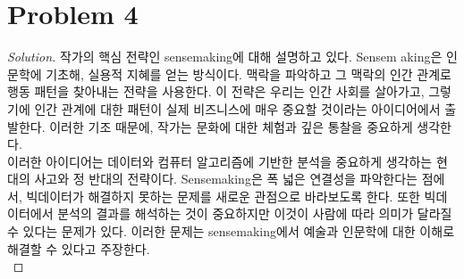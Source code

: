 \section*{Problem 4}
	\begin{proof} [Solution]
		작가의 핵심 전략인 sensemaking에 대해 설명하고 있다. Sensem aking은 인문학에 기초해, 실용적 지혜를 얻는 방식이다. 맥락을 파악하고 그 맥락의 인간 관계로 행동 패턴을 찾아내는 전략을 사용한다. 이 전략은 우리는 인간 사회를 살아가고, 그렇기에 인간 관계에 대한 패턴이 실제 비즈니스에 매우 중요할 것이라는 아이디어에서 출발한다. 이러한 기조 때문에, 작가는 문화에 대한 체험과 깊은 통찰을 중요하게 생각한다.\\
		이러한 아이디어는 데이터와 컴퓨터 알고리즘에 기반한 분석을 중요하게 생각하는 현대의 사고와 정 반대의 전략이다. Sensemaking은 폭 넓은 연결성을 파악한다는 점에서, 빅데이터가 해결하지 못하는 문제를 새로운 관점으로 바라보도록 한다. 또한 빅데이터에서 분석의 결과를 해석하는 것이 중요하지만 이것이 사람에 따라 의미가 달라질 수 있다는 문제가 있다. 이러한 문제는 sensemaking에서 예술과 인문학에 대한 이해로 해결할 수 있다고 주장한다.\\
	\end{proof}
